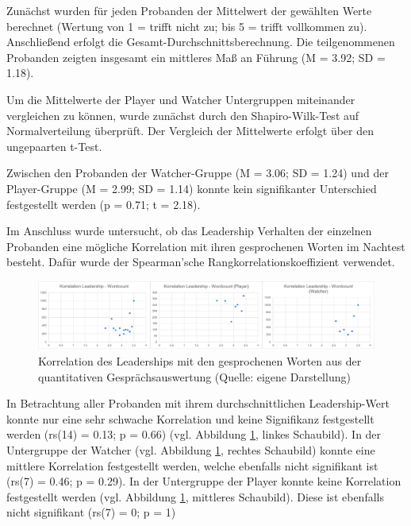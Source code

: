 Zunächst wurden für jeden Probanden der Mittelwert der gewählten Werte berechnet (Wertung von 1 = trifft nicht zu; bis 5 = trifft vollkommen zu). Anschließend erfolgt die Gesamt-Durchschnittsberechnung. Die teilgenommenen Probanden zeigten insgesamt ein mittleres Maß an Führung (M = 3.92; SD = 1.18). 

Um die Mittelwerte der Player und Watcher Untergruppen miteinander vergleichen zu können, wurde zunächst durch den Shapiro-Wilk-Test auf Normalverteilung überprüft. Der Vergleich der Mittelwerte erfolgt über den ungepaarten t-Test.

Zwischen den Probanden der Watcher-Gruppe (M = 3.06; SD = 1.24) und der Player-Gruppe (M = 2.99; SD = 1.14) konnte kein signifikanter Unterschied festgestellt werden (p = 0.71; t = 2.18). 

Im Anschluss wurde untersucht, ob das Leadership Verhalten der einzelnen Probanden eine mögliche Korrelation mit ihren gesprochenen Worten im Nachtest besteht. Dafür wurde der Spearman'sche Rangkorrelationskoeffizient verwendet.

\begin{figure}[ht]
\centering
\includegraphics[width=1\linewidth]{content/pictures/Korrelation_Leadership_Wordcount_full.png}
\caption{Korrelation des Leaderships mit den gesprochenen Worten aus der quantitativen Gesprächsauswertung (Quelle: eigene Darstellung)}
\label{fig:correlation_leadership_wordcount}
\end{figure}

In Betrachtung aller Probanden mit ihrem durchschnittlichen Leadership-Wert konnte nur eine sehr schwache Korrelation und keine Signifikanz festgestellt werden (rs(14) = 0.13; p = 0.66) (vgl. Abbildung \ref{fig:correlation_leadership_wordcount}, linkes Schaubild). In der Untergruppe der Watcher (vgl. Abbildung \ref{fig:correlation_leadership_wordcount}, rechtes Schaubild) konnte eine mittlere Korrelation festgestellt werden, welche ebenfalls nicht signifikant ist (rs(7) = 0.46; p = 0.29). In der Untergruppe der Player konnte keine Korrelation festgestellt werden (vgl. Abbildung \ref{fig:correlation_leadership_wordcount}, mittleres Schaubild). Diese ist ebenfalls nicht signifikant (rs(7) = 0; p = 1)

